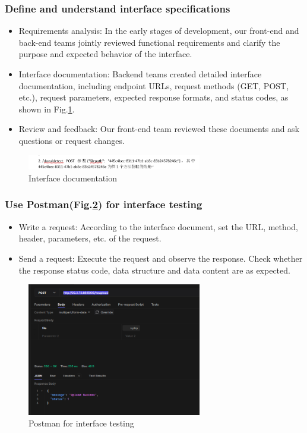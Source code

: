 \documentclass[journal]{IEEEtran}
\begin{document}
\subsubsection{Define and understand interface specifications}
\begin{itemize}
  \item Requirements analysis: In the early stages of development, our front-end and back-end teams jointly reviewed functional requirements and clarify the purpose and expected behavior of the interface.
  \item Interface documentation: Backend teams created detailed interface documentation, including endpoint URLs, request methods (GET, POST, etc.), request parameters, expected response formats, and status codes, as shown in Fig.\ref{fig:interfacespec}.
  \item Review and feedback: Our front-end team reviewed these documents and ask questions or request changes.
\end{itemize}

\begin{figure}[!t]
  \centering
  \includegraphics[width=3in]{figures/solution-interspec.png}
  \caption{Interface documentation}
  \label{fig:interfacespec}
  \end{figure}

\subsubsection{Use Postman(Fig.\ref{fig:postman}) for interface testing}
\begin{itemize}
  \item Write a request: According to the interface document, set the URL, method, header, parameters, etc. of the request.
  \item Send a request: Execute the request and observe the response. Check whether the response status code, data structure and data content are as expected.
\end{itemize}

\begin{figure}[!t]
  \centering
  \includegraphics[width=3in]{figures/solution-postman.png}
  \caption{Postman for interface testing}
  \label{fig:postman}
  \end{figure}
\end{document}

